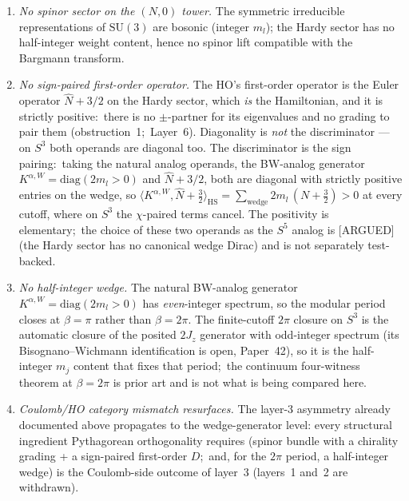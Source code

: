 \documentclass[twocolumn,pra,amsmath,amssymb,superscriptaddress]{revtex4-2}
\begin{document}
\begin{enumerate}\setlength{\itemsep}{2pt}
\item \emph{No spinor sector on the $(N, 0)$ tower.}  The
  symmetric irreducible representations of $\mathrm{SU}(3)$ are
  bosonic (integer $m_l$); the Hardy sector has no half-integer
  weight content, hence no spinor lift compatible with the
  Bargmann transform.
\item \emph{No sign-paired first-order operator.}  The HO's
  first-order operator is the Euler operator $\hat{N} + 3/2$ on the
  Hardy sector, which \emph{is} the Hamiltonian, and it is strictly
  positive:\ there is no $\pm$-partner for its eigenvalues and no
  grading to pair them (obstruction~1;\ Layer~6).  Diagonality is
  \emph{not} the discriminator --- on $S^3$ both operands are diagonal
  too.  The discriminator is the sign pairing:\ taking the natural
  analog operands, the BW-analog generator
  $K^{\alpha, W} = \mathrm{diag}(2 m_l > 0)$ and $\hat{N} + 3/2$, both
  are diagonal with strictly positive entries on the wedge, so
  $\langle K^{\alpha, W}, \hat{N} + \tfrac32\rangle_{\mathrm{HS}}
  = \sum_{\mathrm{wedge}} 2 m_l\,(N + \tfrac32) > 0$ at every cutoff,
  where on $S^3$ the $\chi$-paired terms cancel.  The positivity is
  elementary;\ the choice of these two operands as the $S^5$ analog is
  [ARGUED] (the Hardy sector has no canonical wedge Dirac) and is not
  separately test-backed.
\item \emph{No half-integer wedge.}  The natural BW-analog
  generator $K^{\alpha, W} = \mathrm{diag}(2 m_l > 0)$ has
  \emph{even}-integer spectrum, so the modular period closes at
  $\beta = \pi$ rather than $\beta = 2\pi$.  The finite-cutoff $2\pi$
  closure on $S^3$ is the automatic closure of the posited $2J_z$
  generator with odd-integer spectrum (its Bisognano--Wichmann
  identification is open, Paper~42), so it is the half-integer $m_j$
  content that fixes that period;\ the continuum four-witness
  theorem at $\beta = 2\pi$ is prior art and is not what is being
  compared here.
\item \emph{Coulomb/HO category mismatch resurfaces.}  The
  layer-3 asymmetry already documented above propagates to
  the wedge-generator level: every structural ingredient
  Pythagorean orthogonality requires (spinor bundle with a
  chirality grading + a sign-paired first-order $D$;\ and, for the
  $2\pi$ period, a half-integer wedge) is the
  Coulomb-side outcome of layer~3 (layers~1 and~2 are withdrawn).
\end{enumerate}
\end{document}
